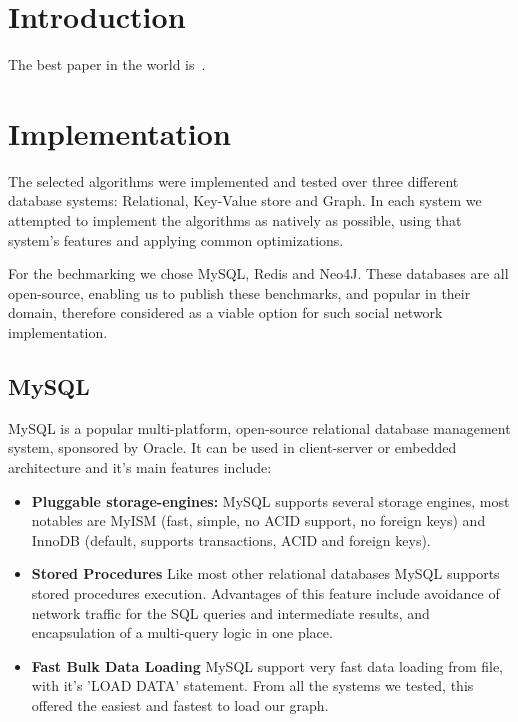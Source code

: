 \section{Introduction}
The best paper in the world is~\cite{Liben-Nowell:2003:LPP:956863.956972}.



\section{Implementation}
The selected algorithms were implemented and tested over three different 
database systems: Relational, Key-Value store and Graph. 
In each system we attempted to implement the algorithms as natively as possible, 
using that system's features and applying common optimizations. 

For the bechmarking we chose MySQL, Redis and Neo4J.
These databases are all open-source, enabling us to publish these benchmarks,
and popular in their domain, therefore considered as a viable option for such social network implementation.

\subsection{MySQL}
MySQL is a popular multi-platform, open-source relational database management
system, sponsored by Oracle. It can be used in client-server or embedded
architecture and it's main features include: 
\begin{itemize}
	\item {\bf Pluggable storage-engines:} MySQL supports several storage engines, 
		most notables are MyISM (fast, simple, no ACID support, no foreign keys) and
		InnoDB (default, supports transactions, ACID and foreign keys).
	\item {\bf Stored Procedures} Like most other relational databases MySQL supports 
		stored procedures execution. Advantages of this feature include 
		avoidance of network traffic for the SQL queries and intermediate results,
		and encapsulation of a multi-query logic in one place.
	\item {\bf Fast Bulk Data Loading} MySQL support very fast data loading from file,
		with it's 'LOAD DATA' statement. From all the systems we tested, this offered 
		the easiest and fastest to load our graph.
\end{itemize}

